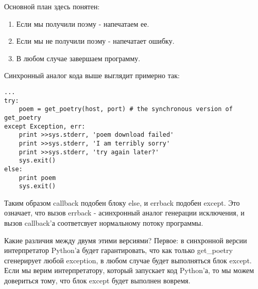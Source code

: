 Основной план здесь понятен:

\begin{enumerate}
\item Если мы получили поэму - напечатаем ее.
\item Если мы не получили поэму - напечатает ошибку.
\item В любом случае завершаем программу.
\end{enumerate}

Синхронный аналог кода выше выглядит 
примерно так:

 \begin{verbatim}
...
try:
    poem = get_poetry(host, port) # the synchronous version of get_poetry
except Exception, err:
    print >>sys.stderr, 'poem download failed'
    print >>sys.stderr, 'I am terribly sorry'
    print >>sys.stderr, 'try again later?'
    sys.exit()
else:
    print poem
    sys.exit()
\end{verbatim} 


Таким образом callback подобен блоку else, и errback 
подобен except. Это означает, что вызов errback - асинхронный 
аналог генерации исключения, и вызов callback'а соответсвует 
нормальному потоку программы. 


Какие различия между двумя этими версиями? 
Первое: в синхронной версии интерпретатор Python'а будет 
гарантировать, что как только get\_poetry сгенерирует любой 
exception, в любом случае будет выполняться блок except. 
Если мы верим интерпретатору, который запускает код Python'а, 
то мы можем довериться тому, что блок except будет выполнен вовремя.


